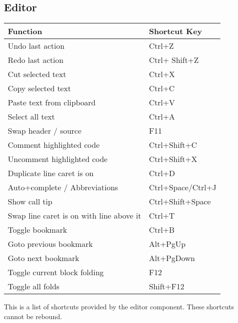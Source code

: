 \subsection{Editor}

\begin{tabular}{|l|l|}\hline
Function		                &   Shortcut Key\\ \hline
Undo last action 	            &   Ctrl+Z\\ \hline
Redo last action 	            &   Ctrl+ Shift+Z\\ \hline
Cut selected text               &   Ctrl+X\\ \hline
Copy selected text              &   Ctrl+C\\ \hline
Paste text from clipboard       &   Ctrl+V\\ \hline
Select all text                 &   Ctrl+A\\ \hline
Swap header / source 	        &	F11\\ \hline
Comment highlighted code        &	Ctrl+Shift+C\\ \hline
Uncomment highlighted code      & 	Ctrl+Shift+X\\ \hline
Duplicate line caret is on      & 	Ctrl+D\\ \hline
Auto+complete / Abbreviations   & 	Ctrl+Space/Ctrl+J\\ \hline
Show call tip 	                &	Ctrl+Shift+Space\\ \hline
Swap line caret is on with line above it    &	Ctrl+T\\ \hline
Toggle bookmark 	            &	Ctrl+B\\ \hline
Goto previous bookmark 	        &	Alt+PgUp\\ \hline
Goto next bookmark 	            &	Alt+PgDown\\ \hline
Toggle current block folding 	&	F12\\ \hline
Toggle all folds 	            &	Shift+F12\\ \hline
\end{tabular}

This is a list of shortcuts provided by the \codeblocks editor component. These shortcuts cannot be rebound.

